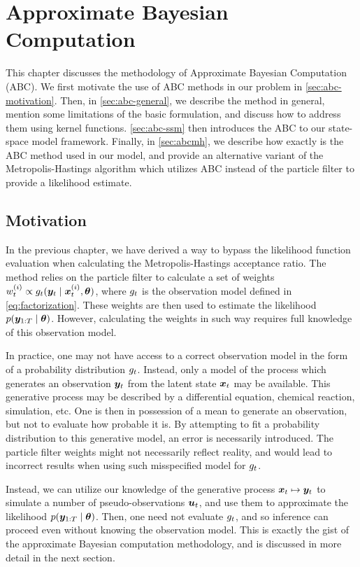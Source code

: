 \chapter{Approximate Bayesian Computation}
\label{chap:abc}

This chapter discusses the methodology of Approximate Bayesian Computation (ABC). We first motivate the use of ABC methods in our problem in \autoref{sec:abc-motivation}. Then, in \autoref{sec:abc-general}, we describe the method in general, mention some limitations of the basic formulation, and discuss how to address them using kernel functions. \autoref{sec:abc-ssm} then introduces the ABC to our state-space model framework. Finally, in \autoref{sec:abcmh}, we describe how exactly is the ABC method used in our model, and provide an alternative variant of the Metropolis-Hastings algorithm which utilizes ABC instead of the particle filter to provide a likelihood estimate.


\section{Motivation} \label{sec:abc-motivation}
In the previous chapter, we have derived a way to bypass the likelihood function evaluation when calculating the Metropolis-Hastings acceptance ratio. The method relies on the particle filter to calculate a set of weights $w_t^{(i)} \propto g_t(\bm{y}_t \mid \bm{x}_t^{(i)}, \bm{\theta})$, where $g_t$ is the observation model defined in \eqref{eq:factorization}. These weights are then used to estimate the likelihood $p(\bm{y}_{1:T} \mid \bm{\theta})$. However, calculating the weights in such way requires full knowledge of this observation model.

In practice, one may not have access to a correct observation model in the form of a probability distribution $g_t$. Instead, only a model of the process which generates an observation $\bm{y}_t$ from the latent state $\bm{x}_t$ may be available. This generative process may be described by a differential equation, chemical reaction, simulation, etc. One is then in possession of a mean to generate an observation, but not to evaluate how probable it is. By attempting to fit a probability distribution to this generative model, an error is necessarily introduced. The particle filter weights might not necessarily reflect reality, and would lead to incorrect results when using such misspecified model for $g_t$.

Instead, we can utilize our knowledge of the generative process $\bm{x}_t \mapsto \bm{y}_t$ to simulate a number of pseudo-observations $\bm{u}_t$, and use them to approximate the likelihood $p(\bm{y}_{1:T} \mid \bm{\theta})$. Then, one need not evaluate $g_t$, and so inference can proceed even without knowing the observation model. This is exactly the gist of the approximate Bayesian computation methodology, and is discussed in more detail in the next section.


